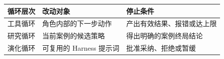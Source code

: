 \begin{tabular}{@{}P{3.0cm}P{4.6cm}P{4.9cm}@{}}
\toprule
\textbf{循环层次} & \textbf{改动对象} & \textbf{停止条件} \\
\midrule
工具循环 & 角色内部的下一步动作 & 产出有效结果、报错或达上限 \\
研究循环 & 当前案例的候选策略 & 得出明确的案例终局结论 \\
演化循环 & 可复用的 Harness 提示词 & 批准采纳、拒绝或暂缓 \\
\bottomrule
\end{tabular}
